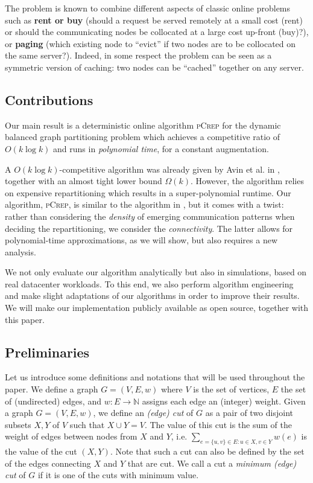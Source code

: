 \documentclass[a4paper,UKenglish,cleveref, autoref, thm-restate,authorcolumns]{lipics-v2019}
\newcommand{\adjDel}{\textsc{pCrep}}
\newcommand{\coreDel}{\text{C{\scriptsize REP}-C{\scriptsize ORE}}}
\begin{document}
The problem is known to combine different aspects of classic online
problems such as \textbf{rent or buy} \cite{Epstein2014}
(should a request be served remotely at a small cost (rent) or should the communicating nodes be collocated at a large cost up-front (buy)?),
or \textbf{paging} (which existing node to ``evict'' 
if two nodes are to be collocated on the same server?).
Indeed, in some respect the problem can be seen as
a symmetric version of caching: two nodes can be ``cached''
together on any server.

\subsection{Contributions}

Our main result is a deterministic online algorithm \adjDel{}
for the dynamic balanced graph partitioning problem 
which achieves a competitive ratio of $O(k\log k)$
and runs in \emph{polynomial time}, for a constant augmentation. 

A $O(k\log k)$-competitive algorithm was already given by 
Avin et al. in \cite{Avin2016}, together with an almost tight lower bound
$\Omega(k)$. However, the algorithm relies on expensive repartitioning
which results in a super-polynomial runtime.   
Our algorithm, \adjDel{}, is similar to the algorithm in \cite{Avin2016},
but it comes with a twist: rather than considering the \emph{density}
of emerging communication patterns when deciding the repartitioning,
we consider the \emph{connectivity}. The latter allows for polynomial-time
approximations, as we will show, but also requires a new analysis.

We not only evaluate our algorithm analytically but also in simulations,
based on real datacenter workloads. 
To this end, 
we also perform algorithm engineering and make 
slight adaptations of our algorithms in order to improve their results.
We will make our implementation publicly available as open source,
together with this paper.

\subsection{Preliminaries}

Let us introduce some 
definitions and notations 
that will be used throughout the paper.
We define a graph $G=(V, E, w)$ 
where $V$ is the set of vertices,
$E$ the set of (undirected) edges,
and $w:E \rightarrow \mathbb{N}$ assigns each edge an (integer) weight.
Given a graph $G=(V,E,w)$,
we define an \textit{(edge) cut} of $G$ as a pair of 
two disjoint subsets $X,Y$ of $V$ such that $X\cup Y=V$. 
The value of this cut is the sum of the weight of edges between 
nodes from $X$ and $Y$, i.e. $\sum_{e=\{u,v\}\in E:u\in X, v\in Y}w(e)$ is the value of the cut $(X,Y)$. Note that such a cut can also be defined by the set of the edges connecting $X$ and $Y$ that are cut. We call a cut a \textit{minimum (edge) cut} of $G$ if it is one of the cuts with minimum value.
\end{document}
